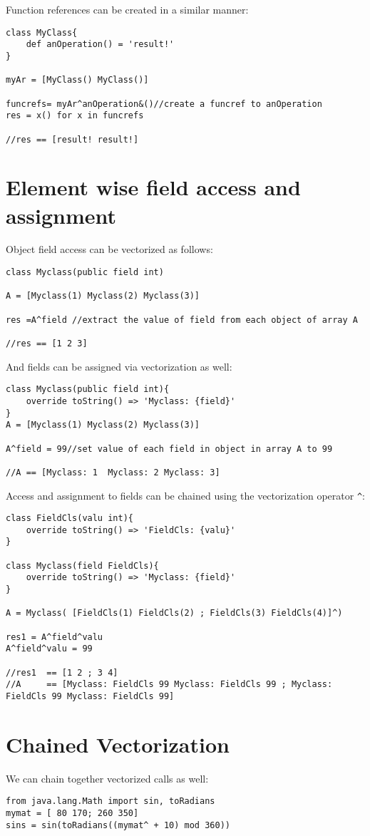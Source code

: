 \documentclass[conc-doc]{subfiles}
\begin{document}
Function references can be created in a similar manner:

\begin{lstlisting}
class MyClass{
	def anOperation() = 'result!'
}

myAr = [MyClass() MyClass()]

funcrefs= myAr^anOperation&()//create a funcref to anOperation
res = x() for x in funcrefs

//res == [result! result!]
\end{lstlisting}

\section{Element wise field access and assignment}
Object field access can be vectorized as follows:
\begin{lstlisting}
class Myclass(public field int)

A = [Myclass(1) Myclass(2) Myclass(3)]

res =A^field //extract the value of field from each object of array A

//res == [1 2 3]
\end{lstlisting}

And fields can be assigned via vectorization as well:
\begin{lstlisting}
class Myclass(public field int){	
	override toString() => 'Myclass: {field}'
}
A = [Myclass(1) Myclass(2) Myclass(3)]

A^field = 99//set value of each field in object in array A to 99

//A == [Myclass: 1  Myclass: 2 Myclass: 3]
\end{lstlisting}

Access and assignment to fields can be chained using the vectorization operator \lstinline{^}:
\begin{lstlisting}
class FieldCls(valu int){
	override toString() => 'FieldCls: {valu}'
}

class Myclass(field FieldCls){
	override toString() => 'Myclass: {field}'
}

A = Myclass( [FieldCls(1) FieldCls(2) ; FieldCls(3) FieldCls(4)]^) 

res1 = A^field^valu
A^field^valu = 99

//res1  == [1 2 ; 3 4]
//A 	== [Myclass: FieldCls 99 Myclass: FieldCls 99 ; Myclass: FieldCls 99 Myclass: FieldCls 99]
\end{lstlisting}

\section{Chained Vectorization}
We can chain together vectorized calls as well:
\begin{lstlisting}
from java.lang.Math import sin, toRadians
mymat = [ 80 170; 260 350]
sins = sin(toRadians((mymat^ + 10) mod 360))
\end{lstlisting}
\end{document}
